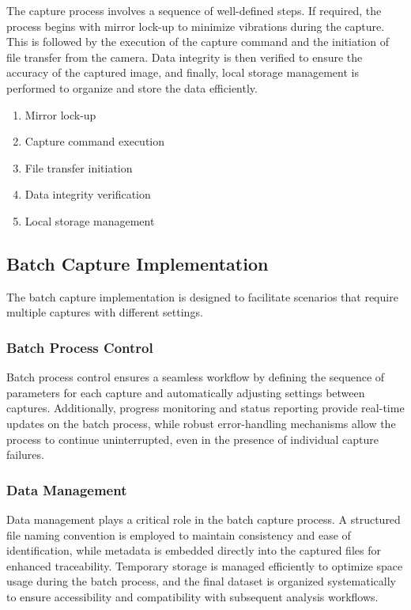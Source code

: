 The capture process involves a sequence of well-defined steps. If required, the process begins with mirror lock-up to minimize vibrations during the capture. This is followed by the execution of the capture command and the initiation of file transfer from the camera. Data integrity is then verified to ensure the accuracy of the captured image, and finally, local storage management is performed to organize and store the data efficiently.

\begin{enumerate}
    \item Mirror lock-up
    \item Capture command execution
    \item File transfer initiation
    \item Data integrity verification
    \item Local storage management
\end{enumerate}

\subsection{Batch Capture Implementation}
The batch capture implementation is designed to facilitate scenarios that require multiple captures with different settings.

\subsubsection{Batch Process Control}
 Batch process control ensures a seamless workflow by defining the sequence of parameters for each capture and automatically adjusting settings between captures. Additionally, progress monitoring and status reporting provide real-time updates on the batch process, while robust error-handling mechanisms allow the process to continue uninterrupted, even in the presence of individual capture failures.

\subsubsection{Data Management}
Data management plays a critical role in the batch capture process. A structured file naming convention is employed to maintain consistency and ease of identification, while metadata is embedded directly into the captured files for enhanced traceability. Temporary storage is managed efficiently to optimize space usage during the batch process, and the final dataset is organized systematically to ensure accessibility and compatibility with subsequent analysis workflows.

